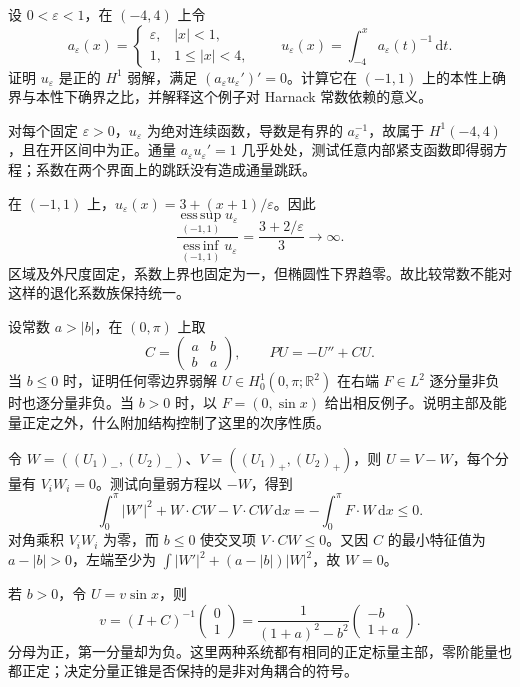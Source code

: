 \begin{exercise}\label{g3:ex:harnack-ellipticity-dependence}
	设 \(0<\varepsilon<1\)，在 \((-4,4)\) 上令
	\[
		a_\varepsilon(x)=
		\begin{cases}\varepsilon,&|x|<1,\\1,&1\le|x|<4,\end{cases}
		\qquad
		u_\varepsilon(x)=\int_{-4}^x a_\varepsilon(t)^{-1}\,\mathrm dt.
	\]
	证明 \(u_\varepsilon\) 是正的 \(H^1\) 弱解，满足 \((a_\varepsilon u_\varepsilon')'=0\)。计算它在 \((-1,1)\) 上的本性上确界与本性下确界之比，并解释这个例子对 Harnack 常数依赖的意义。
\end{exercise}
\begin{solution}
	对每个固定 \(\varepsilon>0\)，\(u_\varepsilon\) 为绝对连续函数，导数是有界的 \(a_\varepsilon^{-1}\)，故属于 \(H^1(-4,4)\)，且在开区间中为正。通量 \(a_\varepsilon u_\varepsilon'=1\) 几乎处处，测试任意内部紧支函数即得弱方程；系数在两个界面上的跳跃没有造成通量跳跃。

	在 \((-1,1)\) 上，\(u_\varepsilon(x)=3+(x+1)/\varepsilon\)。因此
	\[
		\frac{\operatorname*{ess\,sup}_{(-1,1)}u_\varepsilon}
		{\operatorname*{ess\,inf}_{(-1,1)}u_\varepsilon}
		=\frac{3+2/\varepsilon}{3}\longrightarrow\infty.
	\]
	区域及外尺度固定，系数上界也固定为一，但椭圆性下界趋零。故比较常数不能对这样的退化系数族保持统一。
\end{solution}

\begin{exercise}\label{g3:ex:cooperative-system-comparison}
	设常数 \(a>|b|\)，在 \((0,\pi)\) 上取
	\[
		C=\begin{pmatrix}a&b\\b&a\end{pmatrix},\qquad
		P U=-U''+CU.
	\]
	当 \(b\le0\) 时，证明任何零边界弱解 \(U\in H_0^1(0,\pi;\mathbb R^2)\) 在右端 \(F\in L^2\) 逐分量非负时也逐分量非负。当 \(b>0\) 时，以 \(F=(0,\sin x)\) 给出相反例子。说明主部及能量正定之外，什么附加结构控制了这里的次序性质。
\end{exercise}
\begin{solution}
	令 \(W=( (U_1)_-,(U_2)_-)\)、\(V=( (U_1)_+,(U_2)_+)\)，则 \(U=V-W\)，每个分量有 \(V_iW_i=0\)。测试向量弱方程以 \(-W\)，得到
	\[
		\int_0^\pi |W'|^2+W\cdot CW-V\cdot CW\,\mathrm dx
		=-\int_0^\pi F\cdot W\,\mathrm dx\le0.
	\]
	对角乘积 \(V_iW_i\) 为零，而 \(b\le0\) 使交叉项 \(V\cdot CW\le0\)。又因 \(C\) 的最小特征值为 \(a-|b|>0\)，左端至少为
	\(\int |W'|^2+(a-|b|)|W|^2\)，故 \(W=0\)。

	若 \(b>0\)，令 \(U=v\sin x\)，则
	\[
		v=(I+C)^{-1}\begin{pmatrix}0\\1\end{pmatrix}
		=\frac1{(1+a)^2-b^2}\begin{pmatrix}-b\\1+a\end{pmatrix}.
	\]
	分母为正，第一分量却为负。这里两种系统都有相同的正定标量主部，零阶能量也都正定；决定分量正锥是否保持的是非对角耦合的符号。
\end{solution}

